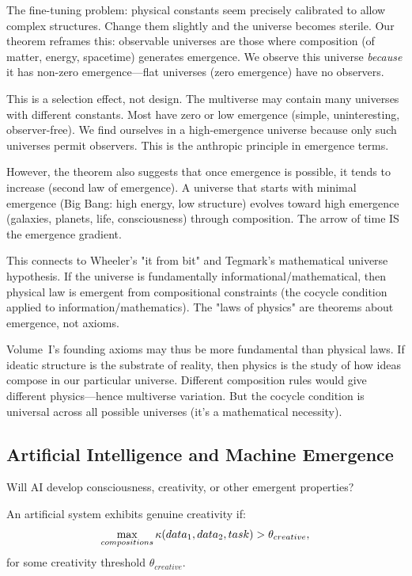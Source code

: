 \begin{interpretation}
The fine-tuning problem: physical constants seem precisely calibrated to allow
complex structures. Change them slightly and the universe becomes sterile. Our
theorem reframes this: observable universes are those where composition (of
matter, energy, spacetime) generates emergence. We observe this universe
\emph{because} it has non-zero emergence---flat universes (zero emergence) have
no observers.

This is a selection effect, not design. The multiverse may contain many universes
with different constants. Most have zero or low emergence (simple, uninteresting,
observer-free). We find ourselves in a high-emergence universe because only such
universes permit observers. This is the anthropic principle in emergence terms.

However, the theorem also suggests that once emergence is possible, it tends to
increase (second law of emergence). A universe that starts with minimal emergence
(Big Bang: high energy, low structure) evolves toward high emergence (galaxies,
planets, life, consciousness) through composition. The arrow of time IS the
emergence gradient.

This connects to Wheeler's "it from bit" and Tegmark's mathematical universe
hypothesis. If the universe is fundamentally informational/mathematical, then
physical law is emergent from compositional constraints (the cocycle condition
applied to information/mathematics). The "laws of physics" are theorems about
emergence, not axioms.

Volume~I's founding axioms may thus be more fundamental than physical laws.
If ideatic structure is the substrate of reality, then physics is the study of
how ideas compose in our particular universe. Different composition rules would
give different physics---hence multiverse variation. But the cocycle condition
is universal across all possible universes (it's a mathematical necessity).
\end{interpretation}

\subsection{Artificial Intelligence and Machine Emergence}

Will AI develop consciousness, creativity, or other emergent properties?

\begin{theorem}
\label{thm:machine-emergence}
An artificial system exhibits genuine creativity if:
\[
  \max_{compositions} \kappa(data_1, data_2, task) > \theta_{creative},
\]
for some creativity threshold $\theta_{creative}$.
\end{theorem}

